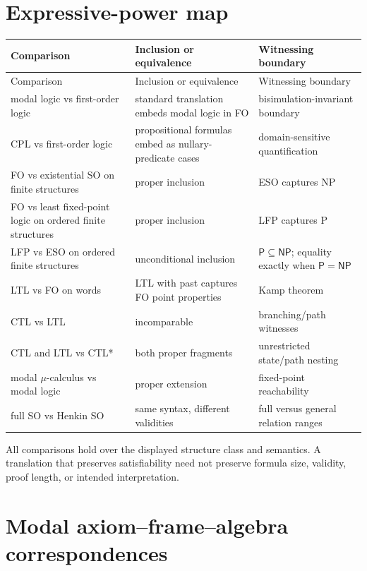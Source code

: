 \section{Expressive-power map}
\label{sec:p14-expressive-table}

\begin{longtable}{@{}p{}p{}p{}@{}}
\toprule
Comparison & Inclusion or equivalence & Witnessing boundary \\
\midrule
\endfirsthead
\toprule
Comparison & Inclusion or equivalence & Witnessing boundary \\
\midrule
\endhead
modal logic vs first-order logic & standard translation embeds modal logic in FO & bisimulation-invariant boundary \cite{VanBenthem1983} \\
CPL vs first-order logic & propositional formulas embed as nullary-predicate cases & domain-sensitive quantification \cite{Enderton2001} \\
FO vs existential SO on finite structures & proper inclusion & ESO captures NP \cite{Fagin1974} \\
FO vs least fixed-point logic on ordered finite structures & proper inclusion & LFP captures P \cite{Immerman1986} \\
LFP vs ESO on ordered finite structures & unconditional inclusion & \(\mathsf P\subseteq\mathsf{NP}\); equality exactly when \(\mathsf P=\mathsf{NP}\) \cite{Immerman1999} \\
LTL vs FO on words & LTL with past captures FO point properties & Kamp theorem \cite{Kamp1968} \\
CTL vs LTL & incomparable & branching/path witnesses \cite{EmersonHalpern1986} \\
CTL and LTL vs CTL* & both proper fragments & unrestricted state/path nesting \cite{EmersonHalpern1986} \\
modal \(\mu\)-calculus vs modal logic & proper extension & fixed-point reachability \cite{Kozen1983} \\
full SO vs Henkin SO & same syntax, different validities & full versus general relation ranges \cite{Henkin1950,Shapiro1991} \\
\bottomrule
\end{longtable}

All comparisons hold over the displayed structure class and semantics. A
translation that preserves satisfiability need not preserve formula size,
validity, proof length, or intended interpretation.

\section{Modal axiom--frame--algebra correspondences}
\label{sec:p14-modal-correspondence}

